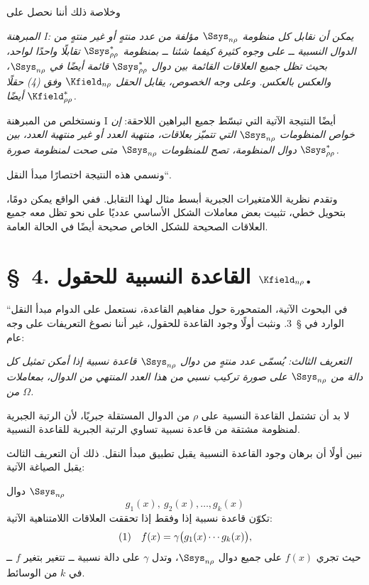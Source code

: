 \documentclass[11pt]{article}
\providecommand{\glqq}{\textquotedblbase}
\providecommand{\grqq}{\textquotedblleft}
\begin{document}
وخلاصة ذلك أننا نحصل على

\emph{المبرهنة I: يمكن أن نقابل كل منظومة $\Ssys_{n\rho}$ مؤلفة من عدد منتهٍ أو غير منتهٍ من الدوال النسبية ــ على وجوه كثيرة كيفما شئنا ــ بمنظومة $\Ssys^*_{\rho\rho}$ تقابلًا واحدًا لواحد، بحيث تظل جميع العلاقات القائمة بين دوال $\Ssys^*_{\rho\rho}$ قائمة أيضًا في $\Ssys_{n\rho}$، والعكس بالعكس. وعلى وجه الخصوص، يقابل الحقل $\Kfield_{n\rho}$ وفق (4) حقلًا $\Kfield^*_{\rho\rho}$ أيضًا.}

ونستخلص من المبرهنة I أيضًا النتيجة الآتية التي تبسّط جميع البراهين اللاحقة: \emph{إن خواص المنظومات $\Ssys_{n\rho}$ التي تتميّز بعلاقات، منتهية العدد أو غير منتهية العدد، بين دوال المنظومة، تصح للمنظومات $\Ssys_{n\rho}$ متى صحت لمنظومة صورة $\Ssys^*_{\rho\rho}$.}

ونسمي هذه النتيجة اختصارًا \glqq{}مبدأ النقل\grqq{}.

وتقدم نظرية اللامتغيرات الجبرية أبسط مثال لهذا التقابل. ففي الواقع يمكن دومًا، بتحويل خطي، تثبيت بعض معاملات الشكل الأساسي عدديًا على نحو تظل معه جميع العلاقات الصحيحة للشكل الخاص صحيحة أيضًا في الحالة العامة.

\section*{\S\ 4. القاعدة النسبية للحقول $\Kfield_{n\rho}$.}

في البحوث الآتية، المتمحورة حول مفاهيم القاعدة، نستعمل على الدوام \glqq{}مبدأ النقل\grqq{} الوارد في \S\ 3. ونثبت أولًا وجود القاعدة للحقول، غير أننا نصوغ التعريفات على وجه عام:

\emph{التعريف الثالث: يُسمّى عدد منتهٍ من دوال $\Ssys_{n\rho}$ قاعدة نسبية إذا أمكن تمثيل كل دالة من $\Ssys_{n\rho}$ على صورة تركيب نسبي من هذا العدد المنتهي من الدوال، بمعاملات من $\Omega$.}

لا بد أن تشتمل القاعدة النسبية على $\rho$ من الدوال المستقلة جبريًا، لأن الرتبة الجبرية لمنظومة مشتقة من قاعدة نسبية تساوي الرتبة الجبرية للقاعدة النسبية.

نبين أولًا أن برهان وجود القاعدة النسبية يقبل تطبيق مبدأ النقل. ذلك أن التعريف الثالث يقبل الصياغة الآتية:

دوال $\Ssys_{n\rho}$
\[
g_1(x),\ g_2(x),\ldots,g_k(x)
\]
تكوّن قاعدة نسبية إذا وفقط إذا تحققت العلاقات اللامتناهية الآتية:
\[
\begin{array}{@{}l@{\quad}c@{}}
(1)& f(x)=\gamma\bigl(g_1(x)\cdots g_k(x)\bigr),
\end{array}
\]
حيث تجري $f(x)$ على جميع دوال $\Ssys_{n\rho}$، وتدل $\gamma$ على دالة نسبية ــ تتغير بتغير $f$ ــ في $k$ من الوسائط.
\end{document}
